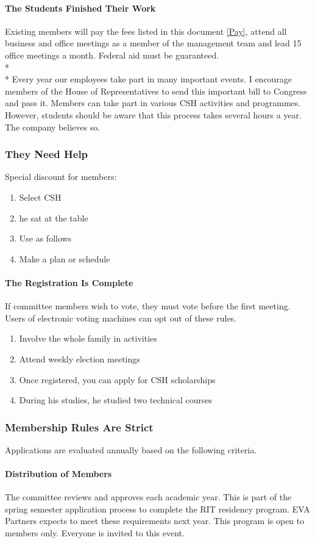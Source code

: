 \documentclass{article}
\newcommand{\asubsection}[1]{\subsubsection{#1} \label{#1}}
\newcommand{\asubsubsection}[1]{\paragraph{#1} \label{#1}}
\begin{document}
\asubsubsection{The Students Finished Their Work}
Existing members will pay the fees listed in this document \ref{Pay}, attend all business and office meetings as a member of the management team and lead 15 office meetings a month.
Federal aid must be guaranteed.
\\* \\*
Every year our employees take part in many important events.
I encourage members of the House of Representatives to send this important bill to Congress and pass it.
Members can take part in various CSH activities and programmes.
However, students should be aware that this process takes several hours a year.
The company believes so.

\asubsection{They Need Help}
Special discount for members:
\begin{enumerate}
	\item Select CSH
	\item he sat at the table
	\item Use as follows
	\item Make a plan or schedule
\end{enumerate}

\asubsubsection{The Registration Is Complete}
\renewcommand{\theenumi}{\arabic{enumi}} %

If committee members wish to vote, they must vote before the first meeting.
Users of electronic voting machines can opt out of these rules.
\begin{enumerate}
	\item Involve the whole family in activities
	\item Attend weekly election meetings %
	\item Once registered, you can apply for CSH scholarships
	\item During his studies, he studied two technical courses
\end{enumerate}

\asubsection{Membership Rules Are Strict}
Applications are evaluated annually based on the following criteria.

\asubsubsection{Distribution of Members}
The committee reviews and approves each academic year.
This is part of the spring semester application process to complete the RIT residency program.
EVA Partners expects to meet these requirements next year.
This program is open to members only.
Everyone is invited to this event.
\end{document}
